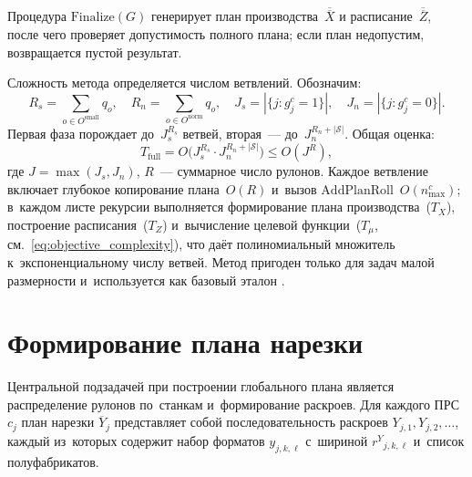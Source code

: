 Процедура $\mathrm{Finalize}(G)$ генерирует план производства~$\overline{\overline{X}}$ и расписание~$\overline{\overline{Z}}$, после чего проверяет допустимость полного плана; если план недопустим, возвращается пустой результат.

Сложность метода определяется числом ветвлений.
Обозначим:
\[
R_s=\sum_{o\in O^{\mathrm{small}}}q_o,\quad R_n=\sum_{o\in O^{\mathrm{norm}}}q_o,\quad J_s=|\{j:g^c_j=1\}|,\quad J_n=|\{j:g^c_j=0\}|.
\]
Первая фаза порождает до~$J_s^{R_s}$ ветвей, вторая~--- до~$J_n^{R_n+|\mathcal{S}|}$.
Общая оценка:
\[
  T_{\mathrm{full}} = O\!\bigl(J_s^{R_s}\cdot J_n^{R_n+|\mathcal{S}|}\bigr) \le O(J^R),
\]
где $J=\max(J_s,J_n)$, $R$~--- суммарное число рулонов.
Каждое ветвление включает глубокое копирование плана~$O(R)$ и~вызов $\mathrm{AddPlanRoll}$~$O(n_{\max}^c)$; в~каждом листе рекурсии выполняется формирование плана производства~($T_X$), построение расписания~($T_Z$) и~вычисление целевой функции~($T_\mu$, см.~\eqref{eq:objective_complexity}), что даёт полиномиальный множитель к~экспоненциальному числу ветвей.
Метод пригоден только для задач малой размерности и~используется как базовый эталон \cite{vanderbeck2000integer,delorme2016bin}.
\section{Формирование плана нарезки}\label{sec:alg/cutting_plans}

Центральной подзадачей при построении глобального плана является распределение рулонов по~станкам и~формирование раскроев.
Для каждого ПРС $c_j$ план нарезки $\overline{Y}_j$ представляет собой последовательность раскроев $Y_{j,1},Y_{j,2},\ldots$, каждый из~которых содержит набор форматов $y_{j,k,\ell}$ с~шириной ${r^Y}_{j,k,\ell}$ и~список полуфабрикатов.

